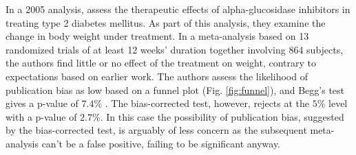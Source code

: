 \documentclass[12pt]{article}
\begin{document}
    

    In a 2005 analysis, \citet{van2005} assess the therapeutic effects
    of alpha-glucosidase inhibitors in treating type 2 diabetes
    mellitus. As part of this analysis, they examine the change in
    body weight under treatment. In a meta-analysis based on 13
    randomized trials of at least 12 weeks' duration together
    involving 864 subjects, the authors find little or no effect of
    the treatment on weight, contrary to expectations based on earlier
    work. The authors assess the likelihood of publication bias as low
    based on a funnel plot (Fig. \ref{fig:funnel}), and Begg's test
    gives a p-value of $7.4\%$ . The bias-corrected test, however,
    rejects at the $5\%$ level with a p-value of $2.7\%$. In this case
    the possibility of publication bias, suggested by the
    bias-corrected test, is arguably of less concern as the subsequent
    meta-analysis can't be a false positive, failing to be significant
    anyway.
\end{document}
